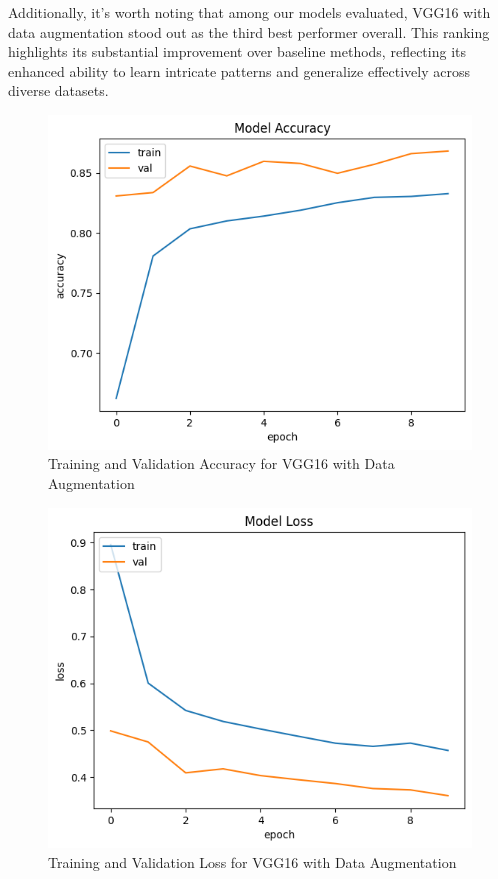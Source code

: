 \documentclass[conference]{IEEEtran}
\begin{document}
Additionally, it's worth noting that among our models evaluated, VGG16 with data augmentation stood out as the third best performer overall. This ranking highlights its substantial improvement over baseline methods, reflecting its enhanced ability to learn intricate patterns and generalize effectively across diverse datasets.

\begin{figure}[H]
    \centering
    \includegraphics[width=1\linewidth]{images//VGG16/Training_Validation_Accuracy_VGG16_Data_Augmented.png}
    \caption{Training and Validation Accuracy for VGG16 with Data Augmentation}
    \label{fig:TV_VGG16_DA}
\end{figure}

\begin{figure}[H]
    \centering
    \includegraphics[width=1\linewidth]{images//VGG16/Training_Validation_Loss_VGG16_Data_Augmented.png}
    \caption{Training and Validation Loss for VGG16 with Data Augmentation}
    \label{fig:TV_Loss_VGG16_DA}
\end{figure}
\end{document}
